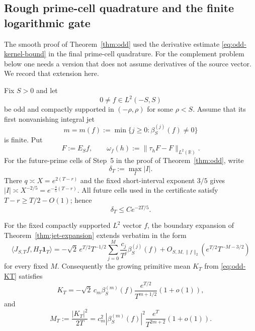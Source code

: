 
\subsection{Rough prime-cell quadrature and the finite logarithmic gate}
\label{subsec:rough-log-gate}

The smooth proof of Theorem~\ref{thm:odd} used the derivative estimate
\eqref{eq:odd-kernel-bound} in the final prime-cell quadrature.  For the complement
problem below one needs a version that does not assume derivatives of the source vector.
We record that extension here.

Fix $S>0$ and let
\[
 0\ne f\in L^2(-S,S)
\]
be odd and compactly supported in $(-\rho,\rho)$ for some $\rho<S$.  Assume that its
first nonvanishing integral jet
\[
 m=m(f):=\min\{j\ge0:\beta_S^{(j)}(f)\ne0\}
\]
is finite.  Put
\[
 F:=E_Sf,
 \qquad
 \omega_f(h):=\|\tau_hF-F\|_{L^2(\mathbb R)}.
\tag{LG.1}\label{eq:loggate-modulus}
\]
For the future-prime cells of Step~5 in the proof of Theorem~\ref{thm:odd}, write
\[
 \delta_T:=\max_I |I|.
\]
There $q\asymp X=e^{2(T-r)}$ and the fixed short-interval exponent $3/5$ gives
$|I|\asymp X^{-2/5}=e^{-\frac45(T-r)}$.  All future cells used in the certificate
satisfy $T-r\ge T/2-O(1)$; hence
\[
 \boxed{\delta_T\le C e^{-2T/5}.}
\tag{LG.2}\label{eq:loggate-cellwidth}
\]

\begin{lemma}
\label{lem:rough-boundary-mean}
For the fixed compactly supported $L^2$ vector $f$, the boundary expansion of
Theorem~\ref{thm:jet-expansion} extends verbatim in the form
\[
 \langle J_{S,T}f,H_T\mathbf1_T\rangle
 =-\sqrt2\,e^{T/2}T^{-1/2}
 \sum_{j=0}^{M}\frac{c_j}{T^j}\beta_S^{(j)}(f)
 +O_{S,M,\|f\|_2}(e^{T/2}T^{-M-3/2})
\tag{LG.3}\label{eq:rough-boundary-expansion}
\]
for every fixed $M$.  Consequently the growing primitive mean $K_T$ from
\eqref{eq:odd-KT} satisfies
\[
 K_T
 =-\sqrt2\,c_m\beta_S^{(m)}(f)
 \frac{e^{T/2}}{T^{m+1/2}}(1+o(1)),
\tag{LG.4}\label{eq:rough-KT}
\]
and
\[
 M_T:=\frac{|K_T|^2}{2T}
 =c_m^2|\beta_S^{(m)}(f)|^2
 \frac{e^T}{T^{2m+2}}(1+o(1)).
\tag{LG.5}\label{eq:rough-MT}
\]
\end{lemma}

